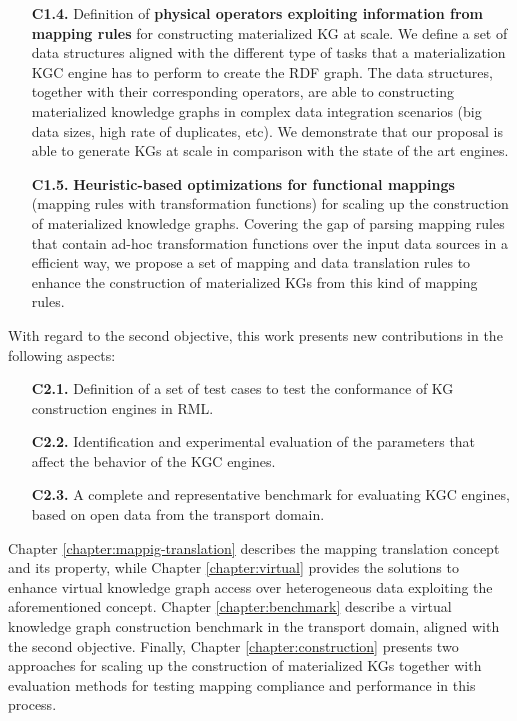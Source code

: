 \begin{enumerate}
    \item[\textbf{C1.4.}] Definition of \textbf{physical operators exploiting information from mapping rules} for constructing materialized KG at scale. We define a set of data structures  aligned with the different type of tasks that a materialization KGC engine has to perform to create the RDF graph. The data structures, together with their corresponding operators, are able to constructing materialized knowledge graphs in complex data integration scenarios (big data sizes, high rate of duplicates, etc). We demonstrate that our proposal is able to generate KGs at scale in comparison with the state of the art engines. 
    \item[\textbf{C1.5.}] \textbf{Heuristic-based optimizations for functional mappings} (mapping rules with transformation functions) for scaling up the construction of materialized knowledge graphs. Covering the gap of parsing mapping rules that contain ad-hoc transformation functions over the input data sources in a efficient way, we propose a set of mapping and data translation rules to enhance the construction of materialized KGs from this kind of mapping rules.
\end{enumerate}

With regard to the second objective, this work presents new contributions in the following aspects:
\begin{enumerate}
    \item[\textbf{C2.1.}] Definition of a set of test cases to test the conformance of KG construction engines in RML.
    \item[\textbf{C2.2.}] Identification and experimental evaluation of the parameters that affect the behavior of the KGC engines. 
    \item[\textbf{C2.3.}] A complete and representative benchmark for evaluating KGC engines, based on open data from the transport domain.
\end{enumerate}


Chapter \ref{chapter:mappig-translation} describes the mapping translation concept and its property, while Chapter \ref{chapter:virtual} provides the solutions to enhance virtual knowledge graph access over heterogeneous data exploiting the aforementioned concept. Chapter \ref{chapter:benchmark} describe a virtual knowledge graph construction benchmark in the transport domain, aligned with the second objective. Finally, Chapter \ref{chapter:construction} presents two approaches for scaling up the construction of materialized KGs together with evaluation methods for testing mapping compliance and performance in this process.

